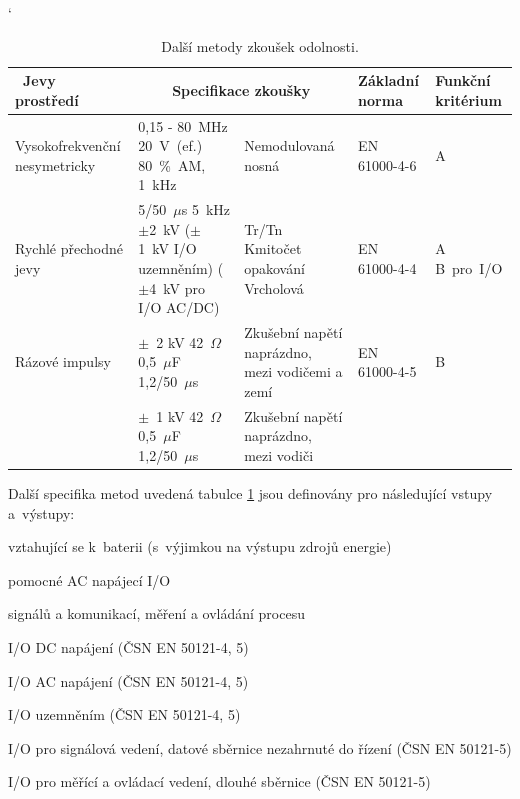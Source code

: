 \begin{table}[!h]
\catcode`
\begin{center}
  	\caption{Další metody zkoušek odolnosti.}
  	\label{tab:emc_odolnosti2}
\begin{tabular}{|p{}|p{}|p{}|p{}|p{}|}
	\hline
	{\bf\ Jevy prostředí} 	& \multicolumn{2}{c}{\bf Specifikace zkoušky}\vline & {\bf Základní norma} & {\bf Funkční kritérium} \\
	\hline
	\hline
Vysokofrekvenční nesymetricky & 0,15 - 80~MHz 20~V~(ef.) 80~\%~AM, 1~kHz & Nemodulovaná nosná	& \begin{center}EN 61000-4-6 \end{center}& \begin{center} A~\end{center} \\ 
	\hline
Rychlé přechodné jevy & 5/50~$\mu$s 5~kHz $\pm$2~kV ($\pm$1~kV I/O uzemněním) ($\pm$4~kV pro I/O AC/DC)& Tr/Tn Kmitočet opakování Vrcholová & \begin{center}  EN 61000-4-4 \end{center} & \begin{center} A \mbox{B pro I/O} \end{center} \\
	\hline
	Rázové impulsy & $\pm$~2 kV 42~$\Omega$ 0,5~$\mu$F 1,2/50~$\mu$s  & Zkušební napětí naprázdno, mezi vodičemi a zemí & \begin{center}  EN 61000-4-5 \end{center} & \begin{center} B \end{center} \\
	\cline{2-3}
			& $\pm$~1 kV 42~$\Omega$ 0,5~$\mu$F 1,2/50~$\mu$s& Zkušební napětí naprázdno, mezi vodiči &  &  \\
	\hline
\end{tabular}
\end{center}
\end{table}

Další specifika metod uvedená tabulce \ref{tab:emc_odolnosti2} jsou definovány pro následující vstupy a~výstupy:
\begin{itemize*}
\item vztahující se k~baterii  (s~výjimkou na výstupu zdrojů energie)
\item pomocné AC napájecí I/O
\item signálů a komunikací, měření a ovládání procesu
\item I/O DC napájení (ČSN EN 50121-4, 5)
\item I/O AC napájení (ČSN EN 50121-4, 5)
\item I/O uzemněním (ČSN EN 50121-4, 5)
\item I/O pro signálová vedení, datové sběrnice nezahrnuté do řízení (ČSN EN 50121-5)
\item I/O pro měřící a ovládací vedení, dlouhé sběrnice (ČSN EN 50121-5)
\end{itemize*}

